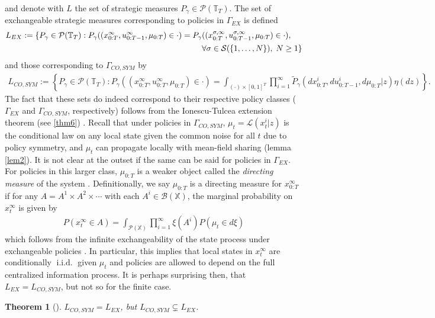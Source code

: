 \documentclass[12pt, oneside]{report}
\newcommand{\mbb}[1]{\mathbb{#1}}
\newcommand{\1}[1]{\mathbbm{1}_{\{#1\}}}
\newcommand{\mc}[1]{\mathcal{#1}}
\DeclareMathOperator{\iid}{i.i.d.}
\newtheorem{theorem}{Theorem}[section]
\theoremstyle{definition}
\begin{document}
and denote with $L$ the set of strategic measures $P_\gamma\in\mc{P}(\mbb{T}_T)$. The set of exchangeable strategic measures corresponding to policies in $\Gamma_{EX}$ is defined
\begin{align}
    L_{EX}:=\{P_\gamma\in\mc{P}(\mbb{T}_T):P_\gamma((x^\infty_{0:T},u^\infty_{0:T-1},\mu_{0:T})\in\cdot)=P_\gamma&((x^{\sigma,\infty}_{0:T},u^{\sigma,\infty}_{0:T-1},\mu_{0:T})\in\cdot),\notag\\
    &\forall\sigma\in\mc{S}(\{1,\dots,N\}),\;N\geq 1\}
\end{align}
and those corresponding to $\Gamma_{CO,\mathit{SYM}}$ by
\begin{align}
    L_{CO,SYM}:=\left\{P_\gamma\in\mc{P}(\mbb{T}_T):P_\gamma((x^\infty_{0:T},u^\infty_{0:T},\mu_{0:T})\in\cdot)=\int_{(\cdot)\times[0,1]^T}\prod_{i=1}^\infty\widetilde{P}_\gamma(dx^i_{0:T},du^i_{0:T-1},d\mu_{0:T}|z)\eta(dz)\right\}.
\end{align}
\indent The fact that these sets do indeed correspond to their respective policy classes ($\Gamma_{EX}$ and $\Gamma_{CO,\mathit{SYM}}$, respectively) follows from the Ionescu-Tulcea extension theorem (see \ref{thm6}) \cite[p.508]{Saldi_Yüksel_2022}.
Recall that under policies in $\Gamma_{CO,\mathit{SYM}}$, $\mu_t=\mc{L}(x^i_t|z)$ is the conditional law on any local state given the common noise for all $t$ due to policy symmetry, and $\mu_t$ can propagate locally with mean-field sharing (lemma \ref{lem2}). It is not clear at the outset if the same can be said for policies in $\Gamma_{EX}$.
For policies in this larger class, $\mu_{0:T}$ is a weaker object called the \textit{directing measure} of the system \cite{Sanjari_Saldi_Yüksel_2024}. Definitionally, we say $\mu_{0:T}$ is a directing measure for $x^\infty_{0:T}$ if for any $A=A^1\times A^2\times\cdots$ with each $A^i\in\mc{B}(\mbb{X})$, the marginal probability
on $x^\infty_t$ is given by
\begin{align}
    P(x^\infty_t\in A)=\int_{\mc{P}(\mbb{X})}\prod_{i=1}^\infty\xi(A^i)P(\mu_t\in d\xi)\label{eq89}
\end{align}
which follows from the infinite exchangeability of the state process under exchangeable policies \cite[definition 2.6]{Aldous_Ibragimov_1985}. In particular,
this implies that local states in $x^\infty_t$ are conditionally $\iid$ given $\mu_t$ \cite[lemma 2.7]{Aldous_Ibragimov_1985} and policies are allowed to depend
on the full centralized information process. It is perhaps surprising then, that $L_{EX}=L_{CO,\mathit{SYM}}$, but not so for the finite case.
\begin{theorem}[{\cite[lemma 2]{Sanjari_Saldi_Yüksel_2024}}]\label{thm7}
    $L_{CO,\mathit{SYM}}=L_{EX}$, but $L_{CO,\mathit{SYM}}\subsetneq L_{EX}$.
\end{theorem}
\end{document}
